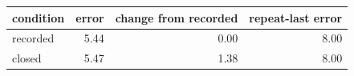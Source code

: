 \begin{tabular}{lrrr}
\toprule
condition & error & change from recorded & repeat-last error \\
\midrule
recorded & 5.44 & 0.00 & 8.00 \\
closed & 5.47 & 1.38 & 8.00 \\
\bottomrule
\end{tabular}
